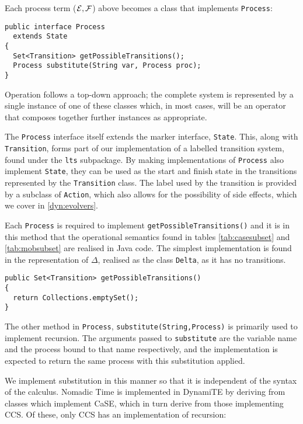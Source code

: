 Each process term ($\text{$\mathcal{E}$}, \text{$\mathcal{F}$}$) above becomes a class that implements \texttt{Process}:

\begin{verbatim}
public interface Process
  extends State
{
  Set<Transition> getPossibleTransitions();
  Process substitute(String var, Process proc);
}
\end{verbatim}

Operation follows a top-down approach; the complete system is
represented by a single instance of one of these classes which, in
most cases, will be an operator that composes together further
instances as appropriate.

The \texttt{Process} interface itself extends the marker interface,
\texttt{State}.  This, along with \texttt{Transition}, forms part of
our implementation of a labelled transition system, found under the
\texttt{lts} subpackage.  By making implementations of
\texttt{Process} also implement \texttt{State}, they can be used as
the start and finish state in the transitions represented by the
\texttt{Transition} class.  The label used by the transition is
provided by a subclass of \texttt{Action}, which also allows for the
possibility of side effects, which we cover in \ref{dyn:evolvers}.

Each \texttt{Process} is required to implement
\texttt{getPossibleTransitions()} and it is in this method that the
operational semantics found in tables \ref{tab:casesubset} and
\ref{tab:mobsubset} are realised in Java code.  The simplest
implementation is found in the representation of $\Delta$, realised as
the class \texttt{Delta}, as it has no transitions.

\begin{verbatim}
public Set<Transition> getPossibleTransitions()
{
  return Collections.emptySet();
}
\end{verbatim}

The other method in \texttt{Process},
\texttt{substitute(String,Process)} is primarily used to implement
recursion.  The arguments passed to \texttt{substitute} are the
variable name and the process bound to that name respectively, and the
implementation is expected to return the same process with this
substitution applied.

We implement substitution in this manner so that it is independent of
the syntax of the calculus.  Nomadic Time is implemented in DynamiTE
by deriving from classes which implement CaSE, which in turn derive
from those implementing CCS.  Of these, only CCS has an implementation
of recursion:

